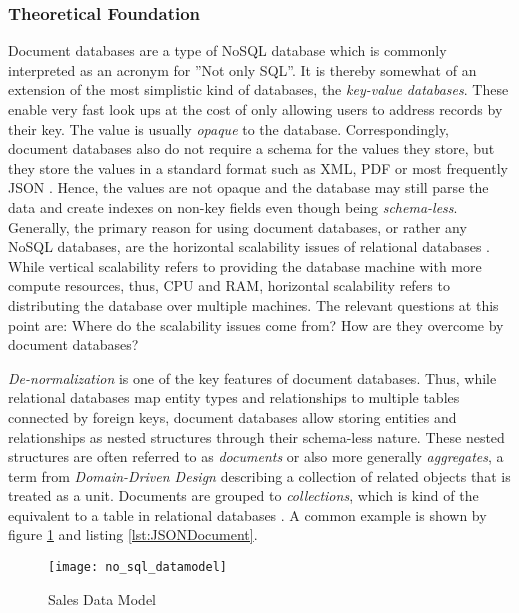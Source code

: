 \subsubsection{Theoretical Foundation}
Document databases are a type of NoSQL database which is commonly interpreted as an acronym for ''Not only SQL''. It is thereby somewhat of an extension of the most simplistic kind of databases, the \emph{key-value databases}. These enable very fast look ups at the cost of only allowing users to address records by their key. The value is usually \emph{opaque} to the database. Correspondingly, document databases also do not require a schema for the values they store, but they store the values in a standard format such as XML, PDF or most frequently JSON \cite{NoSQL}. Hence, the values are not opaque and the database may still parse the data and create indexes on non-key fields even though being \emph{schema-less}.\\

Generally, the primary reason for using document databases, or rather any NoSQL databases, are the horizontal scalability issues of relational databases \cite{NoSQL}. While vertical scalability refers to providing the database machine with more compute resources, thus, CPU and RAM, horizontal scalability refers to distributing the database over multiple machines. The relevant questions at this point are: Where do the scalability issues come from? How are they overcome by document databases?\par
\emph{De-normalization} is one of the key features of document databases. Thus, while relational databases map entity types and relationships to multiple tables connected by foreign keys, document databases allow storing entities and relationships as nested structures through their schema-less nature. These nested structures are often referred to as \emph{documents} or also more generally \emph{aggregates}, a term from \emph{Domain-Driven Design} describing a collection of related objects that is treated as a unit. Documents are grouped to \emph{collections}, which is kind of the equivalent to a table in relational databases \cite{NoSQLDistilled}. A common example is shown by figure \ref{fig:NoSQLDataModel} and listing \ref{lst:JSONDocument}.\par 

\begin{figure}[H]
	\centering
	\texttt{[image: no\_sql\_datamodel]}
	\caption[Sales Data Model]{Sales Data Model }
	\label{fig:NoSQLDataModel}
\end{figure}

